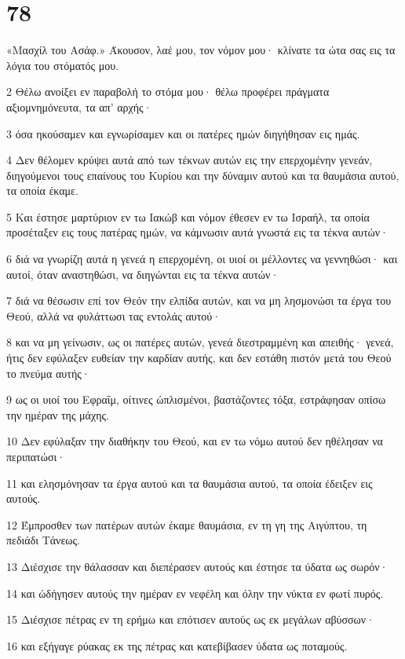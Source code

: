 \chapter{78}

\par «Μασχίλ του Ασάφ.» Άκουσον, λαέ μου, τον νόμον μου· κλίνατε τα ώτα σας εις τα λόγια του στόματός μου.
\par 2 Θέλω ανοίξει εν παραβολή το στόμα μου· θέλω προφέρει πράγματα αξιομνημόνευτα, τα απ' αρχής·
\par 3 όσα ηκούσαμεν και εγνωρίσαμεν και οι πατέρες ημών διηγήθησαν εις ημάς.
\par 4 Δεν θέλομεν κρύψει αυτά από των τέκνων αυτών εις την επερχομένην γενεάν, διηγούμενοι τους επαίνους του Κυρίου και την δύναμιν αυτού και τα θαυμάσια αυτού, τα οποία έκαμε.
\par 5 Και έστησε μαρτύριον εν τω Ιακώβ και νόμον έθεσεν εν τω Ισραήλ, τα οποία προσέταξεν εις τους πατέρας ημών, να κάμνωσιν αυτά γνωστά εις τα τέκνα αυτών·
\par 6 διά να γνωρίζη αυτά η γενεά η επερχομένη, οι υιοί οι μέλλοντες να γεννηθώσι· και αυτοί, όταν αναστηθώσι, να διηγώνται εις τα τέκνα αυτών·
\par 7 διά να θέσωσιν επί τον Θεόν την ελπίδα αυτών, και να μη λησμονώσι τα έργα του Θεού, αλλά να φυλάττωσι τας εντολάς αυτού·
\par 8 και να μη γείνωσιν, ως οι πατέρες αυτών, γενεά διεστραμμένη και απειθής· γενεά, ήτις δεν εφύλαξεν ευθείαν την καρδίαν αυτής, και δεν εστάθη πιστόν μετά του Θεού το πνεύμα αυτής·
\par 9 ως οι υιοί του Εφραΐμ, οίτινες ώπλισμένοι, βαστάζοντες τόξα, εστράφησαν οπίσω την ημέραν της μάχης.
\par 10 Δεν εφύλαξαν την διαθήκην του Θεού, και εν τω νόμω αυτού δεν ηθέλησαν να περιπατώσι·
\par 11 και ελησμόνησαν τα έργα αυτού και τα θαυμάσια αυτού, τα οποία έδειξεν εις αυτούς.
\par 12 Έμπροσθεν των πατέρων αυτών έκαμε θαυμάσια, εν τη γη της Αιγύπτου, τη πεδιάδι Τάνεως.
\par 13 Διέσχισε την θάλασσαν και διεπέρασεν αυτούς και έστησε τα ύδατα ως σωρόν·
\par 14 και ώδήγησεν αυτούς την ημέραν εν νεφέλη και όλην την νύκτα εν φωτί πυρός.
\par 15 Διέσχισε πέτρας εν τη ερήμω και επότισεν αυτούς ως εκ μεγάλων αβύσσων·
\par 16 και εξήγαγε ρύακας εκ της πέτρας και κατεβίβασεν ύδατα ως ποταμούς.
